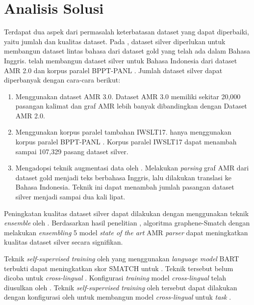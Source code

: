 \section{Analisis Solusi}

Terdapat dua aspek dari permasalah keterbatasan dataset yang dapat diperbaiki, yaitu jumlah dan kualitas dataset.
Pada \amrparsing{}, dataset silver diperlukan untuk membangun dataset lintas bahasa dari dataset gold yang telah ada dalam Bahasa Inggris.
\textcite{putra2022} telah membangun dataset silver untuk Bahasa Indonesia dari dataset AMR 2.0 dan korpus paralel BPPT-PANL .
Jumlah dataset silver dapat diperbanyak dengan cara-cara berikut:
\begin{enumerate}
  \item Menggunakan dataset AMR 3.0.
  Dataset AMR 3.0 memiliki sekitar 20,000 pasangan kalimat dan graf \gls{AMR} lebih banyak dibandingkan dengan Dataset AMR 2.0.

  \item Menggunakan korpus paralel tambahan IWSLT17.
  \textcite{putra2022} hanya menggunakan korpus paralel BPPT-PANL .
  Korpus paralel IWSLT17 dapat menambah sampai 107,329 pasang dataset silver.

  \item Mengadopsi teknik augmentasi data oleh \textcite{lee2022}.
  Melakukan \textit{parsing} graf \gls{AMR} dari dataset gold menjadi teks berbahasa Inggris, lalu dilakukan translasi ke Bahasa Indonesia.
  Teknik ini dapat menambah jumlah pasangan dataset silver menjadi sampai dua kali lipat.
\end{enumerate}

Peningkatan kualitas dataset silver dapat dilakukan dengan menggunakan teknik \textit{ensemble} oleh \textcite{lee2022}.
Berdasarkan hasil penelitian \textcite{lee2022}, algoritma graphene-Smatch  dengan melakukan \textit{ensembling} 5 model \textit{state of the art} \gls{AMR} \textit{parser} dapat meningkatkan kualitas dataset silver secara signifikan.

Teknik \textit{self-supervised training} oleh \textcite{bai2022} yang menggunakan \textit{language model} \gls{BART} terbukti dapat meningkatkan skor \gls{SMATCH} untuk \amrparsing{}.
Teknik tersebut belum dicoba untuk \textit{cross-lingual} \amrparsing{}.
Konfigurasi \textit{training} model \textit{cross-lingual} \amrparsing{} telah diusulkan oleh \textcite{blloshmi2020}.
Teknik \textit{self-supervised training} oleh \textcite{bai2022} tersebut dapat dilakukan dengan konfigurasi oleh \textcite{blloshmi2020} untuk membangun model \textit{cross-lingual} untuk \textit{task} \amrparsing{}.

